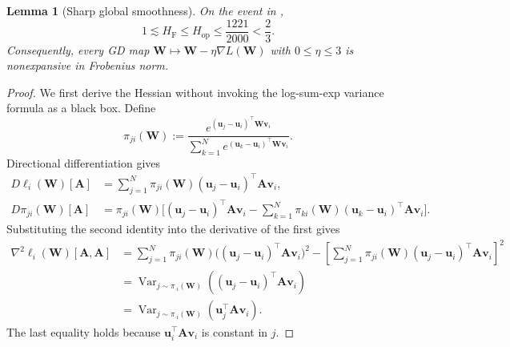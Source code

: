 \documentclass[11pt]{article}
\newtheorem{lemma}[lemma]{Lemma}
\theoremstyle{definition}
\newcommand{\ub}{\mathbf{u}}
\newcommand{\vb}{\mathbf{v}}
\newcommand{\Ab}{\mathbf{A}}
\newcommand{\Wb}{\mathbf{W}}
\newcommand{\HF}{H_{\mathrm F}}
\newcommand{\Hop}{H_{\mathrm{op}}}
\begin{document}
\begin{lemma}[Sharp global smoothness]
\label{lem:smoothness-v2}
On the event in ,
\[
 1\lesssim\HF\leq\Hop
 \leq\frac{1221}{2000}<\frac23.
\]
Consequently, every GD map
$\Wb\mapsto\Wb-\eta\nabla L(\Wb)$ with $0\leq\eta\leq3$ is
nonexpansive in Frobenius norm.
\end{lemma}

\begin{proof}
We first derive the Hessian without invoking the log-sum-exp variance formula
as a black box.  Define
\[
 \pi_{ji}(\Wb)
 :=
 \frac{e^{(\ub_j-\ub_i)^\top\Wb\vb_i}}
 {\sum_{k=1}^Ne^{(\ub_k-\ub_i)^\top\Wb\vb_i}}.
\]
Directional differentiation gives
\begin{align*}
 D\ell_i(\Wb)[\Ab]
 &=\sum_{j=1}^N\pi_{ji}(\Wb)
 (\ub_j-\ub_i)^\top\Ab\vb_i,\\
 D\pi_{ji}(\Wb)[\Ab]
 &=\pi_{ji}(\Wb)\Bigg[
 (\ub_j-\ub_i)^\top\Ab\vb_i-
 \sum_{k=1}^N\pi_{ki}(\Wb)
 (\ub_k-\ub_i)^\top\Ab\vb_i
 \Bigg].
\end{align*}
Substituting the second identity into the derivative of the first gives
\begin{align*}
 \nabla^2\ell_i(\Wb)[\Ab,\Ab]
 &=\sum_{j=1}^N\pi_{ji}(\Wb)
 \bigl((\ub_j-\ub_i)^\top\Ab\vb_i\bigr)^2-
 \left[
  \sum_{j=1}^N\pi_{ji}(\Wb)
  (\ub_j-\ub_i)^\top\Ab\vb_i
 \right]^2\\
 &=\operatorname{Var}_{j\sim\pi_{\cdot i}(\Wb)}
 \!\left((\ub_j-\ub_i)^\top\Ab\vb_i\right)\\
 &=\operatorname{Var}_{j\sim\pi_{\cdot i}(\Wb)}
 \!\left(\ub_j^\top\Ab\vb_i\right).
\end{align*}
The last equality holds because $\ub_i^\top\Ab\vb_i$ is constant in $j$.


\end{proof}
\end{document}
